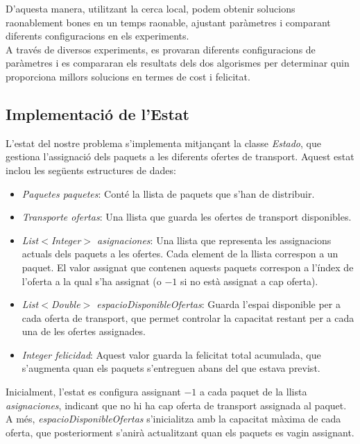 \documentclass[a4paper]{article}
\begin{document}
	D'aquesta manera, utilitzant la cerca local, podem obtenir solucions raonablement bones en un temps raonable, ajustant paràmetres i comparant diferents configuracions en els experiments. \\
	
	A través de diversos experiments, es provaran diferents configuracions de paràmetres i es compararan els resultats dels dos algorismes per determinar quin proporciona millors solucions en termes de cost i felicitat.
	
	\subsection{Implementació de l'Estat}
	
	L'estat del nostre problema s'implementa mitjançant la classe \emph{Estado}, que gestiona l'assignació dels paquets a les diferents ofertes de transport. Aquest estat inclou les següents estructures de dades:
	
	\begin{itemize}
		\item \emph{Paquetes paquetes}: Conté la llista de paquets que s'han de distribuir.
		\item \emph{Transporte ofertas}: Una llista que guarda les ofertes de transport disponibles.
		\item \emph{List$<$Integer$>$ asignaciones}: Una llista que representa les assignacions actuals dels paquets a les ofertes. Cada element de la llista correspon a un paquet. El valor assignat que contenen aquests paquets correspon a l'índex de l'oferta a la qual s'ha assignat (o \(-1\) si no està assignat a cap oferta).
		\item \emph{List$<$Double$>$ espacioDisponibleOfertas}: Guarda l'espai disponible per a cada oferta de transport, que permet controlar la capacitat restant per a cada una de les ofertes assignades.
		\item \emph{Integer felicidad}: Aquest valor guarda la felicitat total acumulada, que s'augmenta quan els paquets s'entreguen abans del que estava previst.
	\end{itemize}
		
	Inicialment, l'estat es configura assignant \(-1\) a cada paquet de la llista \emph{asignaciones}, indicant que no hi ha cap oferta de transport assignada al paquet. A més, \emph{espacioDisponibleOfertas} s'inicialitza amb la capacitat màxima de cada oferta, que posteriorment s'anirà actualitzant quan els paquets es vagin assignant.\\
	
\end{document}
